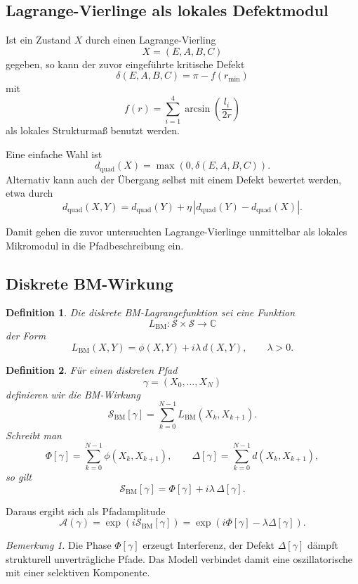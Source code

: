 \documentclass[11pt,a4paper]{article}
\newtheorem{definition}{Definition}
\theoremstyle{remark}
\newtheorem{bemerkung}{Bemerkung}
\begin{document}
	\subsection{Lagrange-Vierlinge als lokales Defektmodul}
	
	Ist ein Zustand \(X\) durch einen Lagrange-Vierling
	\[
	X=(E,A,B,C)
	\]
	gegeben, so kann der zuvor eingeführte kritische Defekt
	\[
	\delta(E,A,B,C)=\pi-f(r_{\min})
	\]
	mit
	\[
	f(r)=\sum_{i=1}^4 \arcsin\!\left(\frac{l_i}{2r}\right)
	\]
	als lokales Strukturmaß benutzt werden.
	
	Eine einfache Wahl ist
	\[
	d_{\mathrm{quad}}(X)=\max(0,\delta(E,A,B,C)).
	\]
	Alternativ kann auch der Übergang selbst mit einem Defekt bewertet werden, etwa durch
	\[
	d_{\mathrm{quad}}(X,Y)
	=
	d_{\mathrm{quad}}(Y)
	+\eta\,|d_{\mathrm{quad}}(Y)-d_{\mathrm{quad}}(X)|.
	\]
	
	Damit gehen die zuvor untersuchten Lagrange-Vierlinge unmittelbar als lokales Mikromodul in die Pfadbeschreibung ein.
	
	\subsection{Diskrete BM-Wirkung}
	
	\begin{definition}
		Die \emph{diskrete BM-Lagrangefunktion} sei eine Funktion
		\[
		L_{\mathrm{BM}}:\mathcal S\times\mathcal S\to\mathbb C
		\]
		der Form
		\[
		L_{\mathrm{BM}}(X,Y)
		=
		\phi(X,Y)+ i\lambda\, d(X,Y),
		\qquad \lambda>0.
		\]
	\end{definition}
	
	\begin{definition}
		Für einen diskreten Pfad
		\[
		\gamma=(X_0,\dots,X_N)
		\]
		definieren wir die \emph{BM-Wirkung}
		\[
		\mathcal S_{\mathrm{BM}}[\gamma]
		=
		\sum_{k=0}^{N-1}L_{\mathrm{BM}}(X_k,X_{k+1}).
		\]
		Schreibt man
		\[
		\Phi[\gamma]
		=
		\sum_{k=0}^{N-1}\phi(X_k,X_{k+1}),
		\qquad
		\Delta[\gamma]
		=
		\sum_{k=0}^{N-1}d(X_k,X_{k+1}),
		\]
		so gilt
		\[
		\mathcal S_{\mathrm{BM}}[\gamma]
		=
		\Phi[\gamma]+ i\lambda\,\Delta[\gamma].
		\]
	\end{definition}
	
	Daraus ergibt sich als Pfadamplitude
	\[
	\mathcal A(\gamma)
	=
	\exp\!\left(i\mathcal S_{\mathrm{BM}}[\gamma]\right)
	=
	\exp\!\left(i\Phi[\gamma]-\lambda\Delta[\gamma]\right).
	\]
	
	\begin{bemerkung}
		Die Phase \(\Phi[\gamma]\) erzeugt Interferenz, der Defekt \(\Delta[\gamma]\) dämpft strukturell unverträgliche Pfade. 
		Das Modell verbindet damit eine oszillatorische mit einer selektiven Komponente.
	\end{bemerkung}
	
\end{document}
